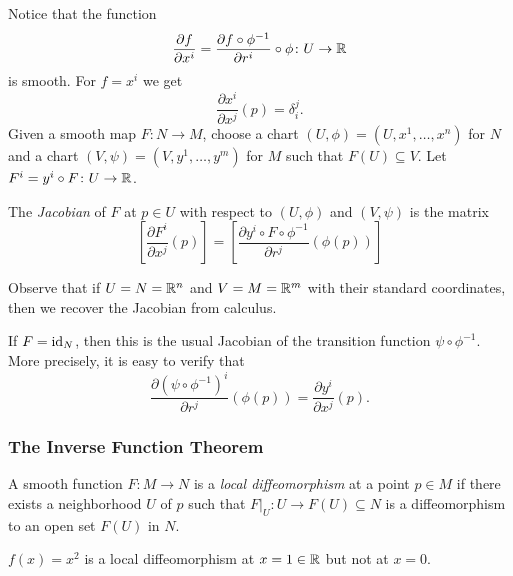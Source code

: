 \begin{frame}
  Notice that 
  the function
  \begin{displaymath}
    \frac{\partial f}{\partial x^i}= \frac{\partial f \circ \phi^{-1}}
    {\partial r^i} \circ \phi \colon U \to \mathbb R
  \end{displaymath}
  is smooth.
  For $f = x^i$ we get 
  \begin{displaymath}
    \frac{\partial x^i}{\partial x^j}(p)= \delta^j_i.
  \end{displaymath}
  Given a smooth map $F \colon N \to M$, choose a chart
  $(U, \phi) = (U, x^1, \dots, x^n)$ for $N$ and a chart
  $(V, \psi) = (V, y^1, \dots, y^m)$ for $M$ such that $F(U) \subseteq V$.
  Let $F^i = y^i \circ F \colon U \to \mathbb R$.
  \begin{defn}
    The {\em Jacobian } of $F$ at $p \in U$ with respect to $(U, \phi)$
    and $(V, \psi)$ is the matrix
    \begin{displaymath}
      \left[\frac{\partial F^i}{\partial x^j}(p)\right] = 
      \left[\frac{\partial y^i \circ F \circ \phi^{-1}}{\partial r^j}(\phi(p))\right]
    \end{displaymath}
  \end{defn}
\end{frame}
\begin{frame}
  Observe that if $U = N = \mathbb R^n$ and $V = M = \mathbb R^m$ 
  with their standard coordinates, then we recover the Jacobian
  from calculus.
  \begin{example}
    If $F = \operatorname{id}_N$, then this is the usual Jacobian of the transition 
    function $\psi \circ \phi^{-1}$. More precisely, it is easy to verify that
    \begin{displaymath}
      \frac{\partial({\psi \circ \phi^{-1}})^i}{\partial r^j}(\phi(p)) =
      \frac{\partial y^i}{\partial x^j}(p).
    \end{displaymath}
  \end{example}
\end{frame}
\begin{frame}
  \frametitle{The Inverse Function Theorem}
  \begin{defn}
    A smooth function $F \colon M \to N$ is a {\em local diffeomorphism}
    at a point $p \in M$ if there exists a neighborhood $U$ of $p$
    such that $F\vert_U \colon U \to F(U) \subseteq N$ is a
    diffeomorphism to an open set $F(U)$ in $N$.
  \end{defn}
  \begin{example}
    $f(x) = x^2$ is a local diffeomorphism at $x = 1 \in \mathbb R$ but not at $x = 0$.
  \end{example}
\end{frame}
